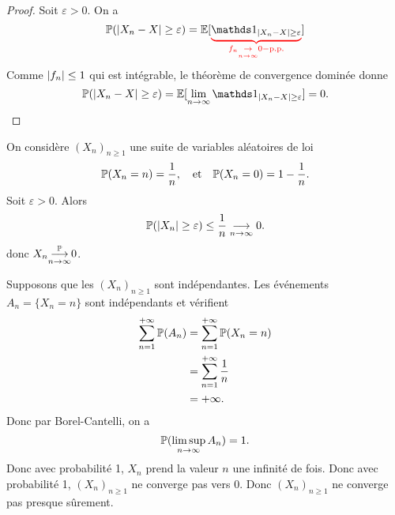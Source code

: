 \begin{proof}
    Soit \(\varepsilon > 0\). On a
    \begin{equation*}
            \bb P(\n{X_n - X} \geq \varepsilon)
            = \bb E[\color{red}\underbrace{\color{black}\one_{\n{X_n - X} \geq \varepsilon}}_{f_n\underset{n\to\infty}{\to}0-\text{p.p.}}\color{black}]
    \end{equation*}
    Comme \(\mathopen{}\left|f_n\right|\mathclose{}\leq 1\) qui est intégrable, le théorème de convergence
    dominée donne
    \begin{equation*}
        \bb P(\n{X_n - X} \geq \varepsilon)
        = \bb E[\lim_{n\to\infty} \one_{\n{X_n - X} \geq \varepsilon}]
        = 0.
    \end{equation*}
\end{proof}

\begin{example}
    On considère \({(X_n)}_{n\geq 1}\) une suite de variables aléatoires
    de loi
    \begin{equation*}
        \mathbb{P}(X_n = n) = \frac{1}{n},\quad\text{et}\quad \mathbb{P}(X_n = 0) = 1 - \frac{1}{n}.
    \end{equation*}
    Soit \(\varepsilon >0\). Alors
    \begin{equation*}
        \mathbb{P}(\mathopen{}\left|X_n\right|\mathclose{} \geq \varepsilon)
        \leq \frac1n \underset{n\to\infty}{\longrightarrow} 0.
    \end{equation*}
    donc \(X_n \underset{n\to\infty}{{\overset{\mathbb{P}}{\longrightarrow}}} 0\).

    Supposons que les \({(X_n)}_{n\geq 1}\) sont indépendantes.
    Les événements \(A_n = \{X_n = n\}\) sont indépendants
    et vérifient
    \begin{equation*}
        \begin{aligned}
            \sum_{n=1}^{+\infty} \mathbb{P}(A_n) 
            &= \sum_{n=1}^{+\infty} \mathbb{P}(X_n = n)\\
            &= \sum_{n=1}^{+\infty} \frac{1}{n}\\
            &= +\infty.
        \end{aligned}
    \end{equation*}
    Donc par Borel-Cantelli, on a
    \begin{equation*}
        \mathbb{P}(\limsup_{n\to\infty} A_n) = 1.
    \end{equation*}
    Donc avec probabilité 1, \(X_n\) prend la valeur \(n\) 
    une infinité de fois. Donc avec probabilité 1, 
    \({(X_n)}_{n\geq 1}\) ne converge pas vers 0.
    Donc \({(X_n)}_{n\geq 1}\) ne converge pas presque sûrement.
\end{example}

